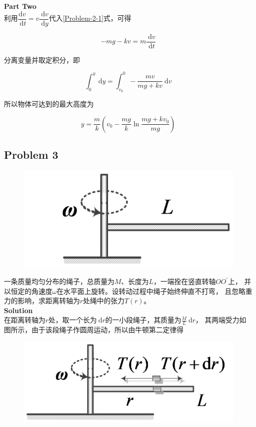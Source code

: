 \documentclass[12pt, a4paper]{article}
\numberwithin{equation}{section}
\newcommand{\rmd}{\mathrm{~d}}
\begin{document}
    \textbf{Part Two}
    \\

    利用$\dfrac{\mathrm{d} v}{\mathrm{~d} t}=v \dfrac{\mathrm{~d} v}{\mathrm{~d} y}$代入\ref{Problem-2-1}式，可得

    $$
        -m g-k v=m \frac{\mathrm{~d} v}{\mathrm{~d} t}
    $$

    分离变量并取定积分，即

    $$
        \int_0^y \mathrm{~d} y=\int_{v_0}^0-\frac{m v}{m g+k v} \mathrm{~d} v
    $$

    所以物体可达到的最大高度为

    $$
        y=\frac{m}{k}\left(v_0-\frac{m g}{k} \ln \frac{m g+k v_0}{m g}\right)
    $$

\subsection{Problem 3}

    \begin{figure}
        \centering
        \includegraphics[scale=0.18]{"Chapter 02 images/pic5.png"}
        \label{pic5}
    \end{figure}

    一条质量均匀分布的绳子，总质量为\(M\)、长度为\(L\)，一端拴在竖直转轴\(OO^{'}\)上，
    并以恒定的角速度\(\omega\)在水平面上旋转。设转动过程中绳子始终伸直不打弯，
    且忽略重力的影响，求距离转轴为\(r\)处绳中的张力\(T\left(r\right)\)。
    \\

    \textbf{Solution}
    \\

    在距离转轴为\(r\)处，取一个长为\(\rmd r\)的一小段绳子，其质量为\(\frac{M}{L} \rmd r\)，
    其两端受力如图所示，由于该段绳子作圆周运动，所以由牛顿第二定律得

    \begin{figure}
        \centering
        \includegraphics[scale=0.18]{"Chapter 02 images/pic6.png"}
        \label{pic6}
    \end{figure}
\end{document}
